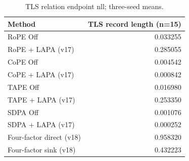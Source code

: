 \begin{table}[t]
\centering
\scriptsize
\caption{TLS relation endpoint nll; three-seed means.}
\begin{tabular}{lr}
\toprule
Method & TLS record length (n=15) \\
\midrule
RoPE Off & 0.033255 \\
RoPE + LAPA (v17) & 0.285055 \\
CoPE Off & 0.004542 \\
CoPE + LAPA (v17) & 0.000842 \\
TAPE Off & 0.016980 \\
TAPE + LAPA (v17) & 0.253350 \\
SDPA Off & 0.001076 \\
SDPA + LAPA (v17) & 0.000252 \\
Four-factor direct (v18) & 0.958320 \\
Four-factor sink (v18) & 0.432223 \\
\bottomrule
\end{tabular}
\end{table}
